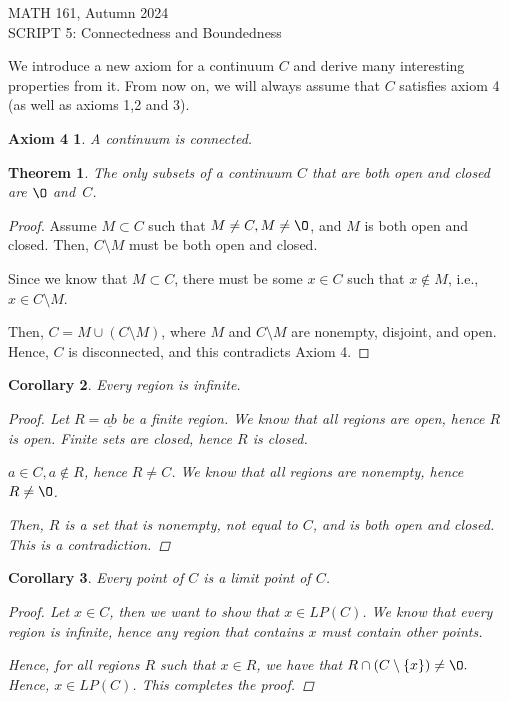 \documentclass[11pt]{article}
\renewcommand{\emptyset}{\O}
\renewcommand{\_}[1]{\underline{ #1 }}
\newcommand{\head}[1]{
	\begin{center}
		{\large #1}
		\vspace{.2 in}
	\end{center}
	
	\bigskip 
}
\newtheorem{theorem}{Theorem}[section]
\newtheorem{corollary}[theorem]{Corollary}
\newtheorem*{axiom4}{Axiom 4}
\theoremstyle{definition}
\numberwithin{equation}{subsection}
\begin{document}
\head
{MATH 161, Autumn 2024\\ SCRIPT 5: Connectedness and Boundedness} 





\setcounter{section}{5}   



We introduce a new axiom for a continuum $C$ and derive many interesting properties from it.  From now on, we will always assume that $C$ satisfies axiom 4 (as well as axioms 1,2 and 3).

\medskip

\begin{axiom4}
A continuum is connected.
\end{axiom4}



\begin{theorem}
The only subsets of a continuum $C$ that are both open and closed are $\emptyset$ and~$C$.
\end{theorem}
\begin{proof}
Assume $M \subset C$ such that $M \neq C, M \neq \emptyset$, and $M$ is both open and closed. Then, $C \setminus M$ must be both open and closed.

Since we know that $M \subset C$, there must be some $x \in C$ such that $x \notin M$, i.e., $x \in C\setminus M$.

Then, $C = M \cup (C \setminus M)$, where $M$ and $C \setminus M$ are nonempty, disjoint, and open. Hence, $C$ is disconnected, and this contradicts Axiom 4.

\renewcommand\qedsymbol{QED}
\end{proof}

\begin{corollary}  Every region is infinite.
\begin{proof}
Let $R = \_{ab}$ be a finite region. We know that all regions are open, hence $R$ is open. Finite sets are closed, hence $R$ is closed.

$a \in C, a \notin R$, hence $R \neq C$. We know that all regions are nonempty, hence $R \neq \emptyset$.

Then, $R$ is a set that is nonempty, not equal to $C$, and is both open and closed. This is a contradiction.

\renewcommand\qedsymbol{QED}
\end{proof}
\end{corollary}

\begin{corollary}  Every point of $C$ is a limit point of $C$.  

\begin{proof}
Let $x \in C$, then we want to show that $x \in LP(C)$. We know that every region is infinite, hence any region that contains $x$ must contain other points.

Hence, for all regions $R$ such that $x \in R$, we have that $R \cap (C \setminus \{x\}) \neq \emptyset.$ Hence, $x \in LP(C)$. This completes the proof.

\renewcommand\qedsymbol{QED}
\end{proof}

\end{corollary}
\end{document}
